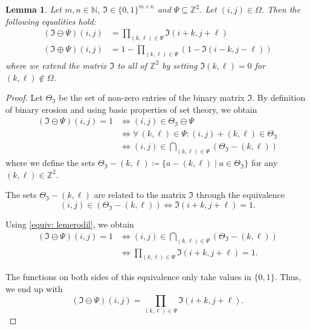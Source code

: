 \documentclass[a4paper,12pt]{article}
\theoremstyle{plain}
\newtheorem{lemma}[theorem]{Lemma}
\theoremstyle{definition}
\numberwithin{equation}{section}
\begin{document}
\begin{lemma}\label{lem: erodil}
	Let $m, n \in \mathbb{N}$, $\mathfrak{I} \in \{ 0, 1 \}^{m \times n}$ and $\Psi \subseteq \mathbb{Z}^2$. Let $(i, j) \in \Omega$. Then the following equalities hold:
	\begin{align}
		(\mathfrak{I} \ominus \Psi)(i, j) &= \prod_{(k, \ell) \in \Psi} \mathfrak{I}(i + k, j + \ell) \label{eq: erosion} \\
		(\mathfrak{I} \oplus \Psi)(i, j) &= 1 - \prod_{(k, \ell) \in \Psi} ( 1 - \mathfrak{I}(i - k, j - \ell) ) \label{eq: dilation}
	\end{align}
	where we extend the matrix $\mathfrak{I}$ to all of $\mathbb{Z}^2$ by setting $\mathfrak{I}(k, \ell) = 0$ for $(k, \ell) \notin \Omega$.
\end{lemma}
\begin{proof}
	Let $\Theta_\mathfrak{I}$ be the set of non-zero entries of the binary matrix $\mathfrak{I}$. By definition of binary erosion and using basic properties of set theory, we obtain
	\begin{align*}
		(\mathfrak{I} \ominus \Psi)(i, j) = 1 &\Leftrightarrow (i, j) \in \Theta_\mathfrak{I} \ominus \Psi \\
		&\Leftrightarrow \forall \, (k, \ell) \in \Psi: (i, j) + (k, \ell) \in \Theta_\mathfrak{I} \\
		&\Leftrightarrow (i, j) \in \bigcap_{(k, \ell) \in \Psi} ( \Theta_\mathfrak{I} - (k, \ell) )
	\end{align*}
	where we define the sets $\Theta_\mathfrak{I} - (k, \ell) \coloneqq \{ a - (k, \ell) \mid a \in \Theta_\mathfrak{I} \}$ for any $(k, \ell) \in \mathbb{Z}^2$.
	
	The sets $\Theta_\mathfrak{I} - (k, \ell)$ are related to the matrix $\mathfrak{I}$ through the equivalence
	\begin{equation}\label{equiv: lemerodil}
		(i, j) \in ( \Theta_\mathfrak{I} - (k, \ell) ) \Leftrightarrow \mathfrak{I}(i + k, j + \ell) = 1.
	\end{equation}
	
	Using \eqref{equiv: lemerodil}, we obtain
	\begin{align*}
		(\mathfrak{I} \ominus \Psi)(i, j) = 1 &\Leftrightarrow (i, j) \in \bigcap_{(k, \ell) \in \Psi} ( \Theta_\mathfrak{I} - (k, \ell) ) \\
		&\Leftrightarrow \prod_{(k, \ell) \in \Psi} \mathfrak{I}(i + k, j + \ell) = 1.
	\end{align*}
	
	The functions on both sides of this equivalence only take values in $\{ 0, 1 \}$. Thus, we end up with
	\begin{equation*}
		(\mathfrak{I} \ominus \Psi)(i, j) = \prod_{(k, \ell) \in \Psi} \mathfrak{I}(i + k, j + \ell).
	\end{equation*}
	

\end{proof}
\end{document}
